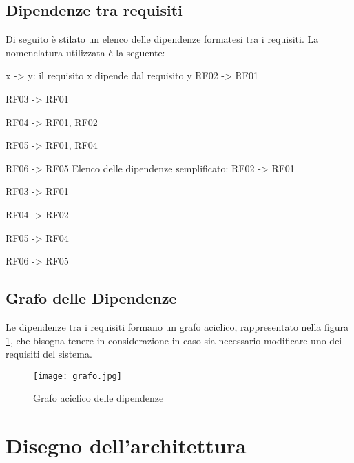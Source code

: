         \subsection{Dipendenze tra requisiti}
        Di seguito è stilato un elenco delle dipendenze formatesi tra i requisiti.
        La nomenclatura utilizzata è la seguente:
        \begin{flushleft}
          x -> y: il requisito x dipende dal requisito y
          \newline
          \newline
          RF02 -> RF01

          RF03 -> RF01

          RF04 -> RF01, RF02

          RF05 -> RF01, RF04

          RF06 -> RF05
          \newline
          \newline
          Elenco delle dipendenze semplificato: 
          \newline
          \newline
          RF02 -> RF01

          RF03 -> RF01

          RF04 -> RF02

          RF05 -> RF04 
          
          RF06 -> RF05
        \end{flushleft}

        \newpage
        \subsection{Grafo delle Dipendenze}
        Le dipendenze tra i requisiti formano un grafo aciclico, rappresentato nella figura \ref{grafoDipendenze}, che bisogna tenere in considerazione in caso sia necessario modificare uno dei requisiti del sistema.

        \begin{figure}[htp]
          \centering
          \texttt{[image: grafo.jpg]}
          \caption{Grafo aciclico delle dipendenze}\label{grafoDipendenze}
        \end{figure}

\section{Disegno dell'architettura}

